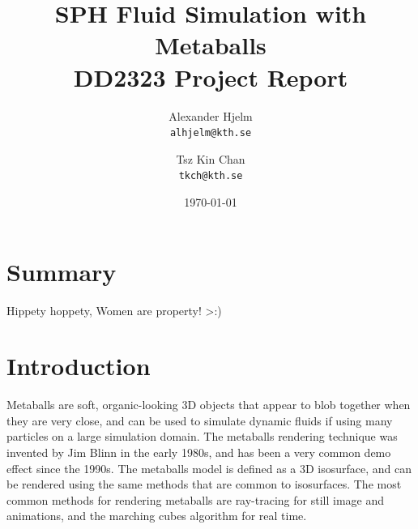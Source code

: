 \documentclass{article}
\begin{document}
    \title{%
    	\textbf{SPH Fluid Simulation with Metaballs} \\
    	\large DD2323 Project Report \\}
   
	\author{
		Alexander Hjelm\\
		\texttt{alhjelm@kth.se}
		\and
		Tsz Kin Chan\\
		\texttt{tkch@kth.se}
	}

    \date{\today}

    \maketitle
    
    \begin{multicols}{2}

    \section{Summary}
    Hippety hoppety, Women are property! >:)
    
    \section{Introduction}

    Metaballs are soft, organic-looking 3D objects that appear to blob together when they are very close, and can be used to simulate dynamic fluids if using many particles on a large simulation domain. 
    The metaballs rendering technique was invented by Jim Blinn in the early 1980s, and has been a very common demo effect since the 1990s.
    The metaballs model is defined as a 3D isosurface, and can be rendered using the same methods that are common to isosurfaces.
    The most common methods for rendering metaballs are ray-tracing for still image and animations, and the marching cubes algorithm for real time.
    \cite{heckbert92}


\end{multicols}
\end{document}
